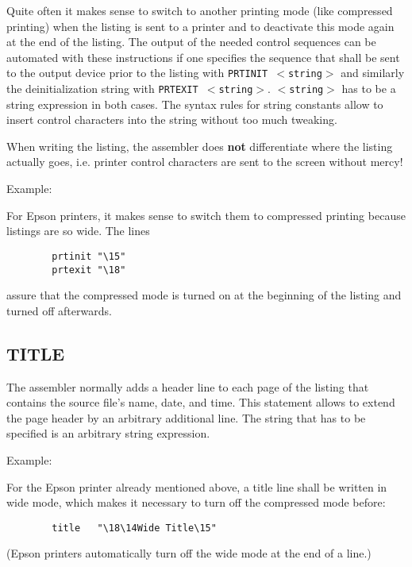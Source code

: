 \documentclass[12pt,twoside]{report}
\makeatletter
\newcommand{\bb}[1]{{\bf #1}}
\newcommand{\tty}[1]{{\tt #1}}
\newcommand{\ttindex}[1]{\index{#1@{\tt #1}}}
\makeatother
\begin{document}
Quite often it makes sense to switch to another printing mode (like
compressed printing) when the listing is sent to a printer and to
deactivate this mode again at the end of the listing.  The output of
the needed control sequences can be automated with these instructions
if one specifies the sequence that shall be sent to the output device
prior to the listing with \tty{PRTINIT $<$string$>$} and similarly the
deinitialization string with \tty{PRTEXIT $<$string$>$}. 
\tty{$<$string$>$} has to be a string expression in both cases.  The syntax
rules for string constants allow to insert control characters into the
string without too much tweaking.

When writing the listing, the assembler does \bb{not} differentiate where
the listing actually goes, i.e. printer control characters are sent to the
screen without mercy!

Example:

For Epson printers, it makes sense to switch them to compressed
printing because listings are so wide.  The lines
\begin{verbatim}
        prtinit "\15"
        prtexit "\18"
\end{verbatim}
assure that the compressed mode is turned on at the beginning of the
listing and turned off afterwards.


\subsection{TITLE}
\ttindex{TITLE}

The assembler normally adds a header line to each page of the listing
that contains the source file's name, date, and time.  This
statement allows to extend the page header by an arbitrary additional
line.  The string that has to be specified is an arbitrary string
expression.

Example:

For the Epson printer already mentioned above, a title line shall be
written in wide mode, which makes it necessary to turn off the
compressed mode before:
\begin{verbatim}
        title   "\18\14Wide Title\15"
\end{verbatim}
(Epson printers automatically turn off the wide mode at the end of a
line.)

\end{document}
